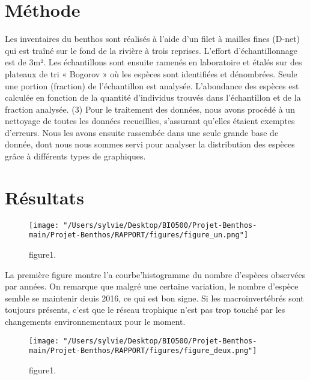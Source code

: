 \documentclass[9pt,twocolumn,twoside,]{pnas-new}
\begin{document}
\hypertarget{muxe9thode}{%
\section*{Méthode}\label{muxe9thode}}

Les inventaires du benthos sont réalisés à l'aide d'un filet à mailles
fines (D-net) qui est traîné sur le fond de la rivière à trois reprises.
L'effort d'échantillonnage est de 3m². Les échantillons sont ensuite
ramenés en laboratoire et étalés sur des plateaux de tri « Bogorov » où
les espèces sont identifiées et dénombrées. Seule une portion (fraction)
de l'échantillon est analysée. L'abondance des espèces est calculée en
fonction de la quantité d'individus trouvés dans l'échantillon et de la
fraction analysée. (3) Pour le traitement des données, nous avons
procédé à un nettoyage de toutes les données recueillies, s'assurant
qu'elles étaient exemptes d'erreurs. Nous les avons ensuite rassembée
dans une seule grande base de donnée, dont nous nous sommes servi pour
analyser la distribution des espèces grâce à différents types de
graphiques.

\hypertarget{ruxe9sultats}{%
\section*{Résultats}\label{ruxe9sultats}}

\begin{figure}
\centering
\texttt{[image: "/Users/sylvie/Desktop/BIO500/Projet-Benthos-main/Projet-Benthos/RAPPORT/figures/figure\_un.png"]}
\caption{figure1. \label{fig1}}
\end{figure}

La première figure montre l'a courbe'histogramme du nombre d'espèces
observées par années. On remarque que malgré une certaine variation, le
nombre d'espèce semble se maintenir deuis 2016, ce qui est bon signe. Si
les macroinvertébrés sont toujours présents, c'est que le réseau
trophique n'est pas trop touché par les changements environnementaux
pour le moment.

\begin{figure}
\centering
\texttt{[image: "/Users/sylvie/Desktop/BIO500/Projet-Benthos-main/Projet-Benthos/RAPPORT/figures/figure\_deux.png"]}
\caption{figure1. \label{fig1}}
\end{figure}
\end{document}

